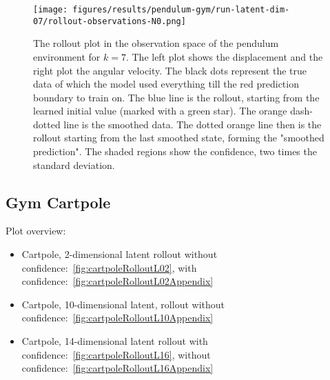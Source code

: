 		\begin{figure}
			\centering
			\texttt{[image: figures/results/pendulum-gym/run-latent-dim-07/rollout-observations-N0.png]}
			\caption[Rollout of the Gym pendulum experiment for 7 latent dimensions]{The rollout plot in the observation space of the pendulum environment for \(k = 7\). The left plot shows the displacement and the right plot the angular velocity. The black dots represent the true data of which the model used everything till the red prediction boundary to train on. The blue line is the rollout, starting from the learned initial value (marked with a green star). The orange dash-dotted line is the smoothed data. The dotted orange line then is the rollout starting from the last smoothed state, forming the "smoothed prediction". The shaded regions show the confidence, \ie two times the standard deviation.}
			\label{fig:gymPendulumRolloutL7}
		\end{figure}

	\subsection{Gym Cartpole}
		Plot overview:
		\begin{itemize}
			\item Cartpole, 2-dimensional latent rollout without confidence:~\autoref{fig:cartpoleRolloutL02}, with confidence:~\autoref{fig:cartpoleRolloutL02Appendix}
			\item Cartpole, 10-dimensional latent, rollout without confidence:~\autoref{fig:cartpoleRolloutL10Appendix}
			\item Cartpole, 14-dimensional latent rollout with confidence:~\autoref{fig:cartpoleRolloutL16}, without confidence:~\autoref{fig:cartpoleRolloutL16Appendix}
		\end{itemize}

